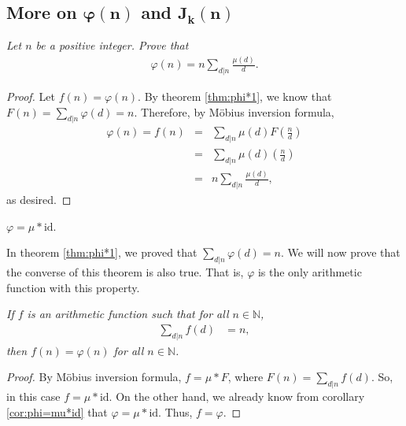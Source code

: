 \documentclass[12pt]{subfile}
\begin{document}
\subsection{More on \texorpdfstring{$\boldsymbol{\varphi(n)}$}{\textphi(n)} and \texorpdfstring{$\boldsymbol{J_k(n)}$}{Jk(n)}}\label{sec:euler-jordan}
		\begin{theorem} \slshape \label{thm:phi=n*sigma(mu/k)}
			Let $n$ be a positive integer. Prove that
			\begin{align*}
			\varphi(n)= n\sum_{d|n} \frac{\mu(d)}{d}.
			\end{align*}
		\end{theorem}

		\begin{proof}
			Let $f(n)=\varphi(n)$. By theorem \ref{thm:phi*1}, we know that $F(n)=\sum\limits_{d|n} \varphi(d)=n$. Therefore, by M\"{o}bius inversion formula,
				\begin{eqnarray*}
					\varphi(n) = f(n) &=& \sum_{d|n}\mu(d)F\left(\frac nd\right)\\
									  &=& \sum_{d|n}\mu(d)\left(\frac nd\right)\\
									  &=& n\sum_{d|n} \frac{\mu(d)}{d},
				\end{eqnarray*}
			as desired.
		\end{proof}


		\begin{corollary}\label{cor:phi=mu*id}
			$\varphi = \mu \ast \text{id}$.
		\end{corollary}

In theorem \ref{thm:phi*1}, we proved that $\sum\limits_{d|n} \varphi(d)=n$. We will now prove that the converse of this theorem is also true. That is, $\varphi$ is the only arithmetic function with this property.

		\begin{theorem}\slshape \label{thm:sumofphicon}
			If $f$ is an arithmetic function such that for all $n\in\mathbb{N} $,
				\begin{align*}
					\sum_{d|n}f(d) & = n,
				\end{align*}
			then $f(n)=\varphi(n)$ for all $n\in\mathbb{N} $.
		\end{theorem}

		\begin{proof}
			By M\"{o}bius inversion formula, $f = \mu \ast F$, where $F(n)=\sum\limits_{d|n}f(d)$. So, in this case $f=\mu \ast \text{id}$. On the other hand, we already know from corollary \ref{cor:phi=mu*id} that $\varphi=\mu \ast \text{id}$. Thus, $f=\varphi$.
		\end{proof}
\end{document}
